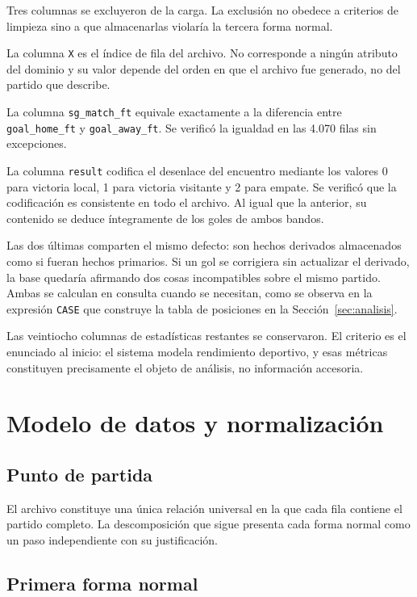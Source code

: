 \documentclass[conference]{IEEEtran}
\begin{document}
Tres columnas se excluyeron de la carga. La exclusión no obedece a criterios de
limpieza sino a que almacenarlas violaría la tercera forma normal.

La columna \texttt{X} es el índice de fila del archivo. No corresponde a ningún
atributo del dominio y su valor depende del orden en que el archivo fue
generado, no del partido que describe.

La columna \texttt{sg\_match\_ft} equivale exactamente a la diferencia entre
\texttt{goal\_home\_ft} y \texttt{goal\_away\_ft}. Se verificó la igualdad en
las 4.070 filas sin excepciones.

La columna \texttt{result} codifica el desenlace del encuentro mediante los
valores 0 para victoria local, 1 para victoria visitante y 2 para empate. Se
verificó que la codificación es consistente en todo el archivo. Al igual que la
anterior, su contenido se deduce íntegramente de los goles de ambos bandos.

Las dos últimas comparten el mismo defecto: son hechos derivados almacenados
como si fueran hechos primarios. Si un gol se corrigiera sin actualizar el
derivado, la base quedaría afirmando dos cosas incompatibles sobre el mismo
partido. Ambas se calculan en consulta cuando se necesitan, como se observa en
la expresión \texttt{CASE} que construye la tabla de posiciones en la
Sección~\ref{sec:analisis}.

Las veintiocho columnas de estadísticas restantes se conservaron. El criterio
es el enunciado al inicio: el sistema modela rendimiento deportivo, y esas
métricas constituyen precisamente el objeto de análisis, no información
accesoria.

\section{Modelo de datos y normalización}

\subsection{Punto de partida}

El archivo constituye una única relación universal en la que cada fila contiene
el partido completo. La descomposición que sigue presenta cada forma normal
como un paso independiente con su justificación.

\subsection{Primera forma normal}
\end{document}
